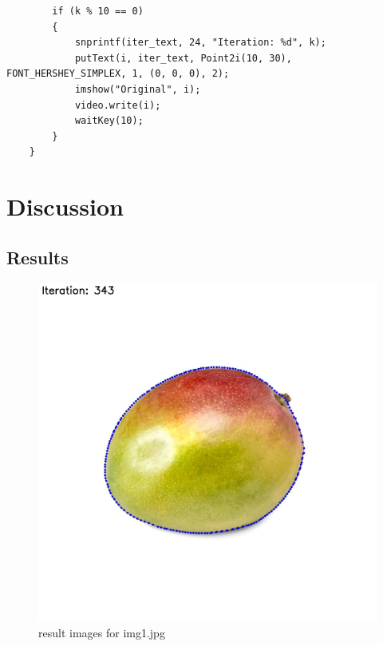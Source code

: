 \documentclass[12pt,a4paper]{report}
\begin{document}
\begin{lstlisting}
        if (k % 10 == 0)
        {
            snprintf(iter_text, 24, "Iteration: %d", k);
            putText(i, iter_text, Point2i(10, 30), FONT_HERSHEY_SIMPLEX, 1, (0, 0, 0), 2);
            imshow("Original", i);
            video.write(i);
            waitKey(10);
        }
    }
\end{lstlisting}

\clearpage



\chapter{Discussion}
\section{Results}
\begin{figure}[!htb]
    \centering
      \includegraphics[height=0.3\paperheight]{result_img/result_img1.jpg}
    \caption{result images for img1.jpg}
\end{figure}
\end{document}
